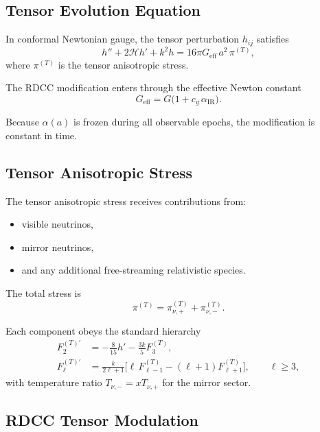 \documentclass[11pt,a4paper]{article}
\begin{document}
\subsection{Tensor Evolution Equation}

In conformal Newtonian gauge, the tensor perturbation $h_{ij}$ satisfies
\begin{equation}
    h'' + 2\mathcal{H}h' + k^{2}h
    = 16\pi G_{\mathrm{eff}}\,a^{2}\,\pi^{(T)},
\end{equation}
where $\pi^{(T)}$ is the tensor anisotropic stress.

The RDCC modification enters through the effective Newton constant
\begin{equation}
    G_{\mathrm{eff}} = G\bigl(1 + c_{g}\,\alpha_{\mathrm{IR}}\bigr).
\end{equation}

Because $\alpha(a)$ is frozen during all observable epochs, the modification is constant in
time.

\subsection{Tensor Anisotropic Stress}

The tensor anisotropic stress receives contributions from:
\begin{itemize}
    \item visible neutrinos,
    \item mirror neutrinos,
    \item and any additional free-streaming relativistic species.
\end{itemize}

The total stress is
\begin{equation}
    \pi^{(T)} = \pi^{(T)}_{\nu,+} + \pi^{(T)}_{\nu,-}.
\end{equation}

Each component obeys the standard hierarchy
\begin{align}
    F^{(T)\prime}_{2} &= -\frac{8}{15}h' - \frac{3k}{5}F^{(T)}_{3}, \\
    F^{(T)\prime}_{\ell} &=
    \frac{k}{2\ell+1}\bigl[\ell\,F^{(T)}_{\ell-1}
    - (\ell+1)F^{(T)}_{\ell+1}\bigr], \qquad \ell \ge 3,
\end{align}
with temperature ratio $T_{\nu,-} = xT_{\nu,+}$ for the mirror sector.

\subsection{RDCC Tensor Modulation}
\end{document}
